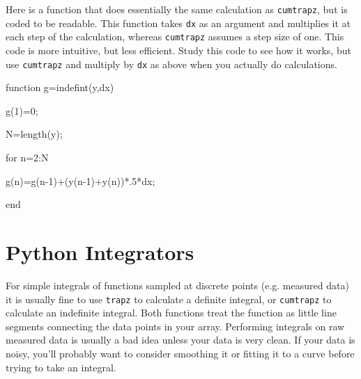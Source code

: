  
Here is a function that does essentially the same calculation as
\texttt{cumtrapz}, but is coded to be readable. This function takes
\texttt{dx} as an argument and multiplies it at each step of the calculation,
whereas \texttt{cumtrapz} assumes a step size of one. This code is more
intuitive, but less efficient. Study this code to see how it works, but use
\texttt{cumtrapz} and multiply by \texttt{dx} as above when you actually do
calculations.
\begin{codeexample}[indefint.py]
\begin{VerbatimOut}{\listingFile}
function g=indefint(y,dx)

%



g(1)=0;

N=length(y);


for n=2:N

   g(n)=g(n-1)+(y(n-1)+y(n))*.5*dx;

end
\end{VerbatimOut}
\end{codeexample}


\section{Python Integrators}

  For simple integrals of functions sampled at discrete points
(e.g. measured data) it is usually fine to use {\tt trapz} to calculate a
definite integral, or {\tt cumtrapz} to calculate an indefinite integral.
Both functions treat the function as little line segments connecting the data
points in your array.  Performing integrals on raw measured data is usually a
bad idea unless your data is very clean. If your data is noisy, you'll
probably want to consider smoothing it or fitting it to a curve before trying
to take an integral.

